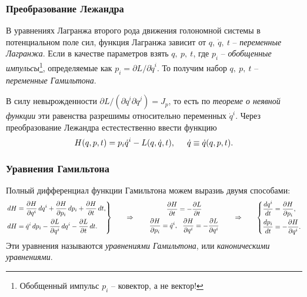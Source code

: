 \subsubsection*{Преобразование Лежандра}

\begin{to_def} 
    В уравнениях Лагранжа второго рода движения голономной системы в потенциальном поле сил, функция Лагранжа зависит от $q, \ \dot{q}, \ t$ -- \textit{переменные Лагранжа}.
    Если в качестве параметров взять $q, \ p, \ t$, где $p_i$ -- \textit{обобщенные импульсы}\footnote{
        Обобщенный импульс $p_i$ -- ковектор, а  не вектор!
    }, определяемые как
    $
        p_i = {\partial L}/{\partial \dot{q}^i}.
    $
    То получим набор $q, \ p, \ t$ -- \textit{переменные Гамильтона}. 
\end{to_def}

В силу невырожденности $\partial L / (\partial \dot{q}^i \partial \dot{q}^j) = J_{p}$, то есть по \textit{теореме о неявной функции} эти равенства разрешимы относительно переменных $\dot{q}^i$. Через преобразование Лежандра естестественно ввести функцию
\begin{equation*}
    H(q, p, t) = p_i \dot{q}^i - L(q, \dot{q}, t),  \hspace{0.5cm} \dot{q} \equiv \dot{q}(q, p, t).
\end{equation*}

\subsubsection*{Уравнения Гамильтона}

Полный дифференциал функции Гамильтона можем выразиь двумя способами:
\begin{equation*}
    \left.\begin{aligned}
        d H &= \frac{\partial H}{\partial q^i} \d q^i + \frac{\partial H}{\partial p_i} \d p_i + \frac{\partial H}{\partial t} \d t,
        \\
        dH &= \dot{q}^i \d p_i - \frac{\partial L}{\partial q^i} \d q^i - \frac{\partial L}{\partial t} \d t.
    \end{aligned}\right\}
    \hspace{0.7cm} \Rightarrow \hspace{0.7cm} 
    \left.\begin{gathered}
        \frac{\partial H}{\partial t} = - \frac{\partial L}{\partial t} \\
        \frac{\partial H}{\partial p_i} = \dot{q}^i, \ \ 
        \frac{\partial H}{\partial q^i} = - \frac{\partial L}{\partial q^i}
    \end{gathered}\right.
    \hspace{0.7cm} \Rightarrow \hspace{0.7cm} 
    \left\{\begin{aligned}
        \frac{d q^i}{d t} &= \frac{\partial H}{\partial p_i}, \\
        \frac{d p_i}{d t} &= - \frac{\partial H}{\partial q^i}.    
    \end{aligned}\right.
\end{equation*}
Эти уравнения называются \textit{уравнениями Гамильтона}, или \textit{каноническими уравнениями}.


